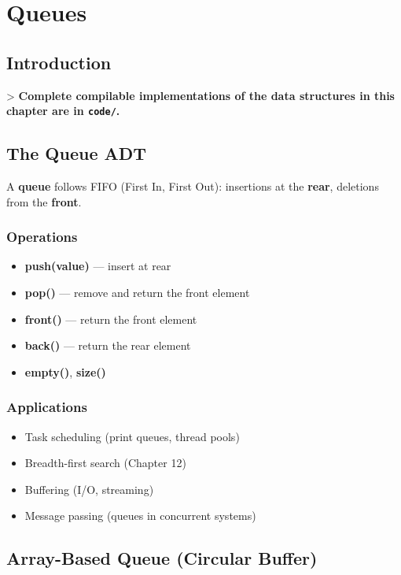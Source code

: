 \chapter{Queues}\label{ch07:queues}

\section{Introduction}

> \textbf{Complete compilable implementations of the data structures in this chapter are in \texttt{code/}.}

\section{The Queue ADT}

A \textbf{queue} follows FIFO (First In, First Out): insertions at the \textbf{rear}, deletions from the \textbf{front}.

\subsection{Operations}

\begin{itemize}
\item \textbf{push(value)} — insert at rear
\item \textbf{pop()} — remove and return the front element
\item \textbf{front()} — return the front element
\item \textbf{back()} — return the rear element
\item \textbf{empty()}, \textbf{size()}
\end{itemize}

\subsection{Applications}

\begin{itemize}
\item Task scheduling (print queues, thread pools)
\item Breadth-first search (Chapter 12)
\item Buffering (I/O, streaming)
\item Message passing (queues in concurrent systems)
\end{itemize}

\section{Array-Based Queue (Circular Buffer)}

